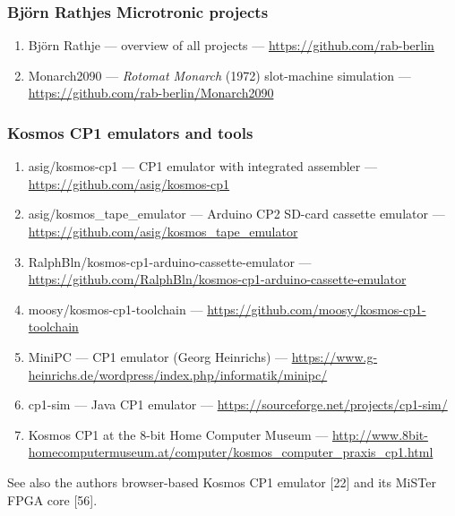 \documentclass[
  11pt,
  letterpaper,
]{article}
\providecommand{\tightlist}{%
  \setlength{\itemsep}{0pt}\setlength{\parskip}{0pt}}
\begin{document}
\subsubsection{Björn Rathje\textquotesingle s Microtronic
projects}\label{bjuxf6rn-rathjes-microtronic-projects}

\begin{enumerate}
\def\labelenumi{\arabic{enumi}.}
\setcounter{enumi}{22}
\tightlist
\item
  Björn Rathje --- overview of all projects ---
  \url{https://github.com/rab-berlin}
\item
  Monarch2090 --- \emph{Rotomat Monarch} (1972) slot-machine simulation
  --- \url{https://github.com/rab-berlin/Monarch2090}
\end{enumerate}

\subsubsection{Kosmos CP1 emulators and
tools}\label{kosmos-cp1-emulators-and-tools}

\begin{enumerate}
\def\labelenumi{\arabic{enumi}.}
\setcounter{enumi}{24}
\tightlist
\item
  asig/kosmos-cp1 --- CP1 emulator with integrated assembler ---
  \url{https://github.com/asig/kosmos-cp1}
\item
  asig/kosmos\_tape\_emulator --- Arduino CP2 SD-card cassette emulator
  --- \url{https://github.com/asig/kosmos_tape_emulator}
\item
  RalphBln/kosmos-cp1-arduino-cassette-emulator ---
  \url{https://github.com/RalphBln/kosmos-cp1-arduino-cassette-emulator}
\item
  moosy/kosmos-cp1-toolchain ---
  \url{https://github.com/moosy/kosmos-cp1-toolchain}
\item
  MiniPC --- CP1 emulator (Georg Heinrichs) ---
  \url{https://www.g-heinrichs.de/wordpress/index.php/informatik/minipc/}
\item
  cp1-sim --- Java CP1 emulator ---
  \url{https://sourceforge.net/projects/cp1-sim/}
\item
  Kosmos CP1 at the 8-bit Home Computer Museum ---
  \url{http://www.8bit-homecomputermuseum.at/computer/kosmos_computer_praxis_cp1.html}
\end{enumerate}

See also the author\textquotesingle s browser-based Kosmos CP1 emulator
{[}22{]} and its MiSTer FPGA core {[}56{]}.
\end{document}
